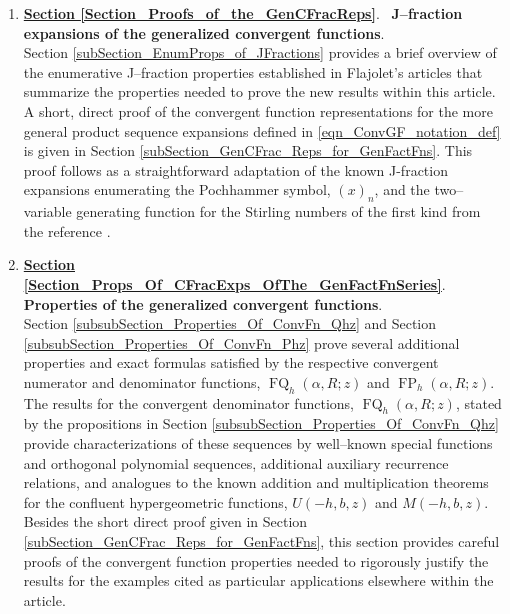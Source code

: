 \documentclass[12pt,reqno]{article}
\numberwithin{sfootnote}{section}
\numberwithin{equation}{section}
\renewcommand{\labelenumi}{\textbf{\arabic{enumi}.}}
\newcommand{\itemlabel}[1]{\textbf{#1}: \\ }
\renewcommand{\labelenumi}{$\mathsmaller{\blacktriangleright}$ }
\theoremstyle{plain}
\theoremstyle{definition}
\theoremstyle{remark}
\newcommand{\Pochhammer}[2]{\ensuremath{\left(#1\right)_{#2}}}
\newcommand{\HypU}[3]{\ensuremath{U\left(#1, #2, #3\right)}}
\newcommand{\HypM}[3]{\ensuremath{M\left(#1, #2, #3\right)}}
\newcommand{\ConvFP}[4]{\ensuremath{\FP_{#1}\left(#2, #3; #4\right)}}
\newcommand{\ConvFQ}[4]{\ensuremath{\FQ_{#1}\left(#2, #3; #4\right)}}
\DeclareMathOperator{\FP}{FP}
\DeclareMathOperator{\FQ}{FQ}
\begin{document}
\newcommand{\sectionpageref}[1]{
     \smaller{\textbf{\textit{(Page \pageref{#1})}}}
} 
\begin{enumerate}[leftmargin=\parindent,itemsep=-1mm]  
     \renewcommand{\labelenumi}{$\mathsmaller\blacktriangleright$ } 
     \renewcommand{\labelenumii}{$\mathsmaller\vartriangleright$ } 

     \renewcommand{\itemlabel}[3][Section]{ 
          \item {\normalsize \textbf{\underline{#1 \ref{#2}}}.\ 
          \textrm{\textbf{#3}}.\ \sectionpageref{#2}} 
     } 

\itemlabel{Section_Proofs_of_the_GenCFracReps}{
           J--fraction expansions of the 
           generalized convergent functions} \\ 
Section \ref{subSection_EnumProps_of_JFractions} 
provides a brief overview of the enumerative 
J--fraction properties 
established in Flajolet's articles that summarize the properties 
needed to prove the new results within this article. 
A short, direct proof of the convergent function representations for the 
more general product sequence expansions defined in 
\eqref{eqn_ConvGF_notation_def} is given in 
Section \ref{subSection_GenCFrac_Reps_for_GenFactFns}. 
This proof follows as a straightforward adaptation of the known 
J-fraction expansions enumerating the Pochhammer symbol, 
$\Pochhammer{x}{n}$, and the two--variable generating function for the 
Stirling numbers of the first kind from the reference 
\citep{FLAJOLET80B}. \\ 

\itemlabel{Section_Props_Of_CFracExps_OfThe_GenFactFnSeries}{
           Properties of the generalized convergent functions} \\ 
Section \ref{subsubSection_Properties_Of_ConvFn_Qhz} and 
Section \ref{subsubSection_Properties_Of_ConvFn_Phz} 
prove several additional properties and exact formulas satisfied by the 
respective convergent numerator and denominator functions, 
$\ConvFQ{h}{\alpha}{R}{z}$ and $\ConvFP{h}{\alpha}{R}{z}$. 
The results for the convergent denominator functions, 
$\ConvFQ{h}{\alpha}{R}{z}$, 
stated by the propositions in 
Section \ref{subsubSection_Properties_Of_ConvFn_Qhz} 
provide characterizations of these sequences by well--known special 
functions and orthogonal polynomial sequences, 
additional auxiliary recurrence relations, and analogues to the known 
addition and multiplication theorems for the 
confluent hypergeometric functions, 
$\HypU{-h}{b}{z}$ and $\HypM{-h}{b}{z}$. 
Besides the short direct proof given in 
Section \ref{subSection_GenCFrac_Reps_for_GenFactFns}, 
this section provides careful proofs of the convergent function 
properties needed to rigorously justify the results for the examples 
cited as particular applications elsewhere within the article. 


\end{enumerate}
\end{document}
